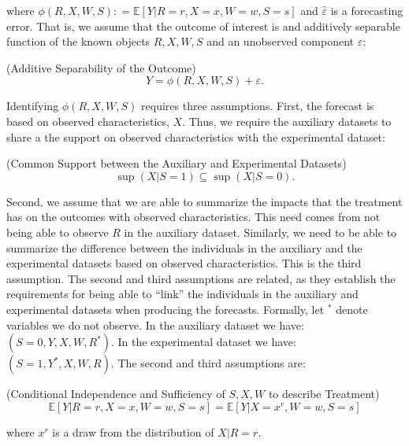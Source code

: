 \noindent where $\phi \left( R, X, W, S \right) : = \mathbb{E} \left[ Y | R = r, X = x, W = w, S = s \right] $ and $\widehat{\varepsilon}$ is a forecasting error. That is, we assume that the outcome of interest is and additively separable function of the known objects $R, X, W, S$ and an unobserved component $\varepsilon$: 

\begin{assumption} (Additive Separability of the Outcome) \label{ass:additive}
\begin{equation}
Y = \phi \left( R, X, W, S \right) + \varepsilon. 
\end{equation}
\end{assumption}

\noindent Identifying $\phi \left( R, X, W, S \right)$ requires three assumptions. First, the forecast is based on observed characteristics, $X$. Thus, we require the auxiliary datasets to share a the support on observed characteristics with the experimental dataset: 

\begin{assumption} \label{ass:support} (Common Support between the Auxiliary and Experimental Datasets)
\begin{equation}
\sup \left( X | S = 1 \right) \subseteq \sup \left( X | S = 0 \right).
\end{equation}
\end{assumption}

\noindent Second, we assume that we are able to summarize the impacts that the treatment has on the outcomes with observed characteristics. This need comes from not being able to observe $R$ in the auxiliary dataset. Similarly, we need to be able to summarize the difference between the individuals in the auxiliary and the experimental datasets based on observed characteristics. This is the third assumption. The second and third  assumptions are related, as they establish the requirements for being able to ``link'' the individuals in the auxiliary and experimental datasets when producing the forecasts. Formally, let $^{*}$ denote variables we do not observe. In the auxiliary dataset we have: $\left( S = 0, Y, X, W, R^* \right)$. In the experimental dataset we have: $\left( S = 1, Y^*, X, W, R \right)$. The second and third assumptions are:  

\begin{assumption} (Conditional Independence and Sufficiency of $S, X, W$ to describe Treatment)
\begin{equation}
\mathbb{E} \left[ Y | R = r, X = x, W = w, S = s\right] =  \mathbb{E} \left[ Y | X = x^r, W = w, S = s\right]
\end{equation}

\noindent where $x^r$ is a draw from the distribution of $X | R = r$. 
\end{assumption}

